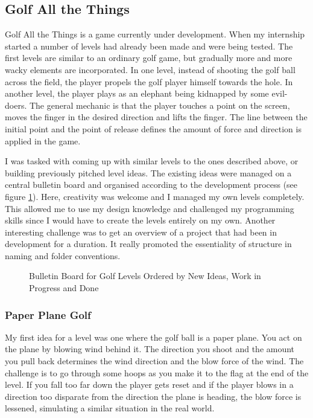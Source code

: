 \subsection{Golf All the Things}
Golf All the Things is a game currently under development. When my internship started a number of levels had already been made and were being tested. The first levels are similar to an ordinary golf game, but gradually more and more wacky elements are incorporated. In one level, instead of shooting the golf ball across the field, the player propels the golf player himself towards the hole. In another level, the player plays as an elephant being kidnapped by some evil-doers. The general mechanic is that the player touches a point on the screen, moves the finger in the desired direction and lifts the finger. The line between the initial point and the point of release defines the amount of force and direction is applied in the game.

I was tasked with coming up with similar levels to the ones described above, or building previously pitched level ideas. The existing ideas were managed on a central bulletin board and organised according to the development process (see figure \ref{Bulletin}). Here, creativity was welcome and I managed my own levels completely. This allowed me to use my design knowledge and challenged my programming skills since I would have to create the levels entirely on my own. Another interesting challenge was to get an overview of a project that had been in development for a duration. It really promoted the essentiality of structure in naming and folder conventions.
\begin{center}
  \begin{figure}[!htb]
    \noindent{}
    \caption{Bulletin Board for Golf Levels Ordered by New Ideas, Work in Progress and Done}
    \label{Bulletin}
  \end{figure}
\end{center}
\subsubsection{Paper Plane Golf}
My first idea for a level was one where the golf ball is a paper plane. You act on the plane by blowing wind behind it. The direction you shoot and the amount you pull back determines the wind direction and the blow force of the wind. The challenge is to go through some hoops as you make it to the flag at the end of the level. If you fall too far down the player gets reset and if the player blows in a direction too disparate from the direction the plane is heading, the blow force is lessened, simulating a similar situation in the real world.

